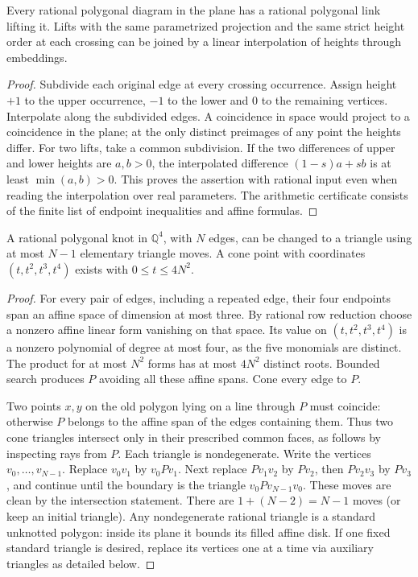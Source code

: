 \begin{proposition}
Every rational polygonal diagram in the plane has a rational polygonal link lifting it. Lifts with the same parametrized projection and the same strict height order at each crossing can be joined by a linear interpolation of heights through embeddings.
\end{proposition}
\begin{proof}
Subdivide each original edge at every crossing occurrence. Assign height $+1$ to the upper occurrence, $-1$ to the lower and $0$ to the remaining vertices. Interpolate along the subdivided edges. A coincidence in space would project to a coincidence in the plane; at the only distinct preimages of any point the heights differ. For two lifts, take a common subdivision. If the two differences of upper and lower heights are $a,b>0$, the interpolated difference $(1-s)a+sb$ is at least $\min(a,b)>0$. This proves the assertion with rational input even when reading the interpolation over real parameters. The arithmetic certificate consists of the finite list of endpoint inequalities and affine formulas.
\end{proof}

\begin{theorem}\label{th:four}
A rational polygonal knot in $\mathbb Q^4$, with $N$ edges, can be changed to a triangle using at most $N-1$ elementary triangle moves. A cone point with coordinates $(t,t^2,t^3,t^4)$ exists with $0\le t\le4N^2$.
\end{theorem}
\begin{proof}
For every pair of edges, including a repeated edge, their four endpoints span an affine space of dimension at most three. By rational row reduction choose a nonzero affine linear form vanishing on that space. Its value on $(t,t^2,t^3,t^4)$ is a nonzero polynomial of degree at most four, as the five monomials are distinct. The product for at most $N^2$ forms has at most $4N^2$ distinct roots. Bounded search produces $P$ avoiding all these affine spans. Cone every edge to $P$.

Two points $x,y$ on the old polygon lying on a line through $P$ must coincide: otherwise $P$ belongs to the affine span of the edges containing them. Thus two cone triangles intersect only in their prescribed common faces, as follows by inspecting rays from $P$. Each triangle is nondegenerate. Write the vertices $v_0,\ldots,v_{N-1}$. Replace $v_0v_1$ by $v_0Pv_1$. Next replace $Pv_1v_2$ by $Pv_2$, then $Pv_2v_3$ by $Pv_3$, and continue until the boundary is the triangle $v_0Pv_{N-1}v_0$. These moves are clean by the intersection statement. There are $1+(N-2)=N-1$ moves (or keep an initial triangle). Any nondegenerate rational triangle is a standard unknotted polygon: inside its plane it bounds its filled affine disk. If one fixed standard triangle is desired, replace its vertices one at a time via auxiliary triangles as detailed below.
\end{proof}

